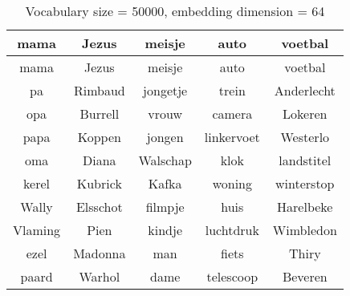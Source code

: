 \begin{table}[H]
\centering
\caption[Vocabulary size = 50000, embedding dimension = 64]{Vocabulary size = 50000, embedding dimension = 64}
\label{tab:emb_experiments}
\begin{tabular}{|c|c|c|c|c|}
\hline
mama & Jezus & meisje & auto & voetbal \\ \hline \hline
mama & Jezus & meisje & auto & voetbal\\
pa & Rimbaud & jongetje & trein & Anderlecht\\
opa & Burrell & vrouw & camera & Lokeren\\
papa & Koppen & jongen & linkervoet & Westerlo\\
oma & Diana & Walschap & klok & landstitel\\
kerel & Kubrick & Kafka & woning & winterstop\\
Wally & Elsschot & filmpje & huis & Harelbeke\\
Vlaming & Pien & kindje & luchtdruk & Wimbledon\\
ezel & Madonna & man & fiets & Thiry\\
paard & Warhol & dame & telescoop & Beveren\\
\hline
\end{tabular}
\end{table}
